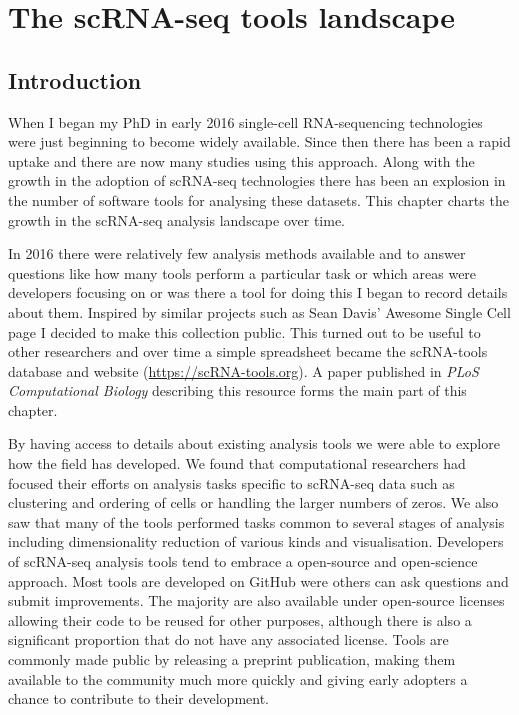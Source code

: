 \documentclass[11pt,a4paper,titlepage,twoside,openright]{style/unimelbthesis}
\theoremstyle{definition}
\theoremstyle{definition}
\theoremstyle{definition}
\theoremstyle{remark}
\begin{document}
\begin{mainmatter}
\hypertarget{the-scrna-seq-tools-landscape}{%
\chapter{The scRNA-seq tools landscape}\label{the-scrna-seq-tools-landscape}}

\hypertarget{introduction-1}{%
\section{Introduction}\label{introduction-1}}

When I began my PhD in early 2016 single-cell RNA-sequencing technologies were just beginning to become widely available. Since then there has been a rapid uptake and there are now many studies using this approach. Along with the growth in the adoption of scRNA-seq technologies there has been an explosion in the number of software tools for analysing these datasets. This chapter charts the growth in the scRNA-seq analysis landscape over time.

In 2016 there were relatively few analysis methods available and to answer questions like how many tools perform a particular task or which areas were developers focusing on or was there a tool for doing this I began to record details about them. Inspired by similar projects such as Sean Davis' Awesome Single Cell page I decided to make this collection public. This turned out to be useful to other researchers and over time a simple spreadsheet became the scRNA-tools database and website (\url{https://scRNA-tools.org}). A paper published in \emph{PLoS Computational Biology} describing this resource forms the main part of this chapter.

By having access to details about existing analysis tools we were able to explore how the field has developed. We found that computational researchers had focused their efforts on analysis tasks specific to scRNA-seq data such as clustering and ordering of cells or handling the larger numbers of zeros. We also saw that many of the tools performed tasks common to several stages of analysis including dimensionality reduction of various kinds and visualisation. Developers of scRNA-seq analysis tools tend to embrace a open-source and open-science approach. Most tools are developed on GitHub were others can ask questions and submit improvements. The majority are also available under open-source licenses allowing their code to be reused for other purposes, although there is also a significant proportion that do not have any associated license. Tools are commonly made public by releasing a preprint publication, making them available to the community much more quickly and giving early adopters a chance to contribute to their development.


\end{mainmatter}
\end{document}
